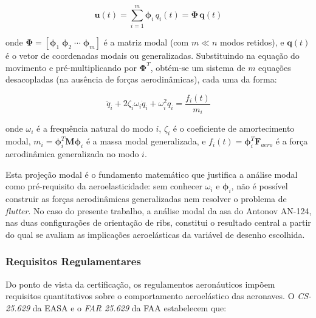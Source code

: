 \documentclass[a4paper,fleqn]{cas-sc}
\begin{document}
\begin{equation}
    \mathbf{u}(t) = \sum_{i=1}^{m} \boldsymbol{\phi}_i \, q_i(t) = 
    \boldsymbol{\Phi} \, \mathbf{q}(t)
    \label{eq:modal_transform}
\end{equation}

\noindent onde $\boldsymbol{\Phi} = [\boldsymbol{\phi}_1 \; 
\boldsymbol{\phi}_2 \; \cdots \; \boldsymbol{\phi}_m]$ é a matriz modal (com $m \ll n$ modos retidos), e $\mathbf{q}(t)$ é o vetor de coordenadas modais ou generalizadas. Substituindo na equação do movimento e pré-multiplicando por $\boldsymbol{\Phi}^T$, obtém-se um sistema de $m$ equações desacopladas (na ausência de forças aerodinâmicas), cada uma da forma:

\begin{equation}
    \ddot{q}_i + 2\zeta_i \omega_i \dot{q}_i + \omega_i^2 q_i = 
    \frac{f_i(t)}{m_i}
    \label{eq:modal_eq}
\end{equation}

\noindent onde $\omega_i$ é a frequência natural do modo $i$, $\zeta_i$ é o coeficiente de amortecimento modal, $m_i = \boldsymbol{\phi}_i^T \mathbf{M} \boldsymbol{\phi}_i$ é a massa modal generalizada, e $f_i(t) = \boldsymbol{\phi}_i^T \mathbf{F}_{aero}$ é a força aerodinâmica generalizada no modo $i$.

Esta projeção modal é o fundamento matemático que justifica a análise modal como pré-requisito da aeroelasticidade: sem conhecer $\omega_i$ e $\boldsymbol{\phi}_i$, não é possível construir as forças aerodinâmicas generalizadas nem resolver o problema de \textit{flutter}. No caso do presente trabalho, a análise modal da asa do Antonov AN-124, nas duas configurações de orientação de ribs, constitui o resultado central a partir do qual se avaliam as implicações aeroelásticas da variável de desenho escolhida.

\subsubsection{Requisitos Regulamentares}

Do ponto de vista da certificação, os regulamentos aeronáuticos impõem requisitos quantitativos sobre o comportamento aeroelástico das aeronaves. O \textit{CS-25.629} da EASA \cite{EASA2022} e o \textit{FAR 25.629} da FAA \cite{FAA2023} estabelecem que:
\end{document}
